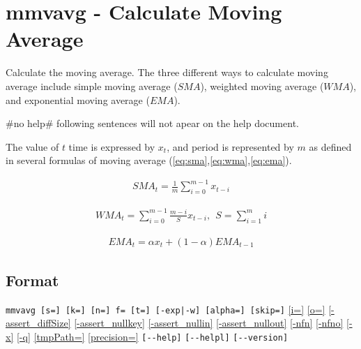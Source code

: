 
%

\section{mmvavg - Calculate Moving Average\label{sect:mmvavg}}

Calculate the moving average. The three different ways to calculate moving average include simple moving average ($SMA$), weighted moving average ($WMA$), and exponential moving average ($EMA$). 


 #no help# following sentences will not apear on the help document. \fi

The value of $t$ time is expressed by $x_t$, and period is represented by $m$ as defined in several formulas of moving average (\ref{eq:sma},\ref{eq:wma},\ref{eq:ema}).


\begin{eqnarray}
SMA_t=\frac{1}{m} \sum_{i=0}^{m-1} x_{t-i}
\label{eq:sma}
\end{eqnarray}

\begin{eqnarray}
WMA_t=\sum_{i=0}^{m-1} \frac{m-i}{S} x_{t-i},\ \ S=\sum_{i=1}^m i
\label{eq:wma}
\end{eqnarray}

\begin{eqnarray}
EMA_t=\alpha x_t + (1-\alpha)EMA_{t-1}
\label{eq:ema}
\end{eqnarray}

\subsection*{Format}
\verb/mmvavg [s=] [k=] [n=] f= [t=] [-exp|-w] [alpha=] [skip=]/
\hyperref[sect:option_i]{[i=]}
\hyperref[sect:option_o]{[o=]}
\hyperref[sect:option_assert_diffSize]{[-assert\_diffSize]}
\hyperref[sect:option_assert_nullkey]{[-assert\_nullkey]}
\hyperref[sect:option_assert_nullin]{[-assert\_nullin]}
\hyperref[sect:option_assert_nullout]{[-assert\_nullout]}
\hyperref[sect:option_nfn]{[-nfn]} 
\hyperref[sect:option_nfno]{[-nfno]}  
\hyperref[sect:option_x]{[-x]}
\hyperref[sect:option_q]{[-q]}
\hyperref[sect:option_option_tmppath]{[tmpPath=]}
\hyperref[sect:option_precision]{[precision=]}
\verb|[--help]|
\verb|[--helpl]|
\verb|[--version]|\\


